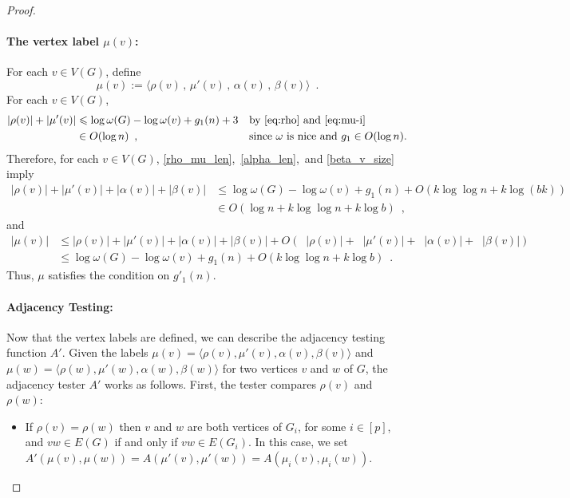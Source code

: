 \documentclass[twoside,leqno]{article}
\let\eqref\cref
\renewcommand{\le}{\leqslant}
\renewcommand{\leq}{\leqslant}
\newcommand{\david}[1]{\noindent{\color{orange} DW: #1}}
\newcommand{\vida}[1]{\noindent{\color{pink} VD: #1}}
\DeclareMathOperator{\lgg}{\hat{lg}}
\newcommand{\Oh}{O}
\begin{document}
\begin{proof}
  \paragraph{The vertex label $\mu(v)$:}
  For each $v\in V(G)$, define
  \[
    \mu(v):=
    \langle \rho(v)\,,\, \mu'(v)\,,\, \alpha(v)\,,\, \beta(v) \rangle \enspace .
  \]
  For each $v\in V(G)$,
  \begin{align}
    |\rho(v)|+|\mu'(v)|
     & \le \log\omega(G)-\log\omega(v)+g_1(n)+3 &  & \textrm{by~\eqref{eq:rho} and~\eqref{eq:mu-i}} \label{rho_mu_len} \\
     & \in \Oh(\log n) \enspace ,               &  & \textrm{since $\omega$ is nice and $g_1\in\Oh(\log n)$.}
    \label{rho_mu_len_x}
  \end{align}
  Therefore, for each $v\in V(G)$, \eqref{rho_mu_len},~\eqref{alpha_len},~and \eqref{beta_v_size} imply
  \begin{align*}
    |\rho(v)|+|\mu'(v)| + |\alpha(v)| + |\beta(v)|
     & \leq
    \log\omega(G)-\log\omega(v) + g_1(n) + \Oh(k\log\log n+k\log(bk)) \\
     & \in\Oh(\log n + k\log\log n+k\log b)\enspace,
  \end{align*}
  and
  \begin{align*}
    |\mu(v)|
     & \leq |\rho(v)|+|\mu'(v)| + |\alpha(v)| + |\beta(v)| + \Oh(\lgg|\rho(v)|+\lgg|\mu'(v)| + \lgg|\alpha(v)| + \lgg|\beta(v)|) \\
     & \leq \log\omega(G)-\log\omega(v) + g_1(n) + \Oh(k\log\log n+k\log b) \enspace .
  \end{align*}
  Thus, $\mu$ satisfies the condition on $g'_1(n)$.

  \paragraph{Adjacency Testing:}
  Now that the vertex labels are defined, we can describe the adjacency testing function $A'$.
  Given the labels $\mu(v)=\langle\rho(v),\mu'(v),\alpha(v),\beta(v)\rangle$ and $\mu(w)=\langle\rho(w),\mu'(w),\alpha(w),\beta(w)\rangle$ for two vertices $v$ and $w$ of $G$, the adjacency tester $A'$ works as follows. First, the tester compares $\rho(v)$ and $\rho(w)$:
  \begin{itemize}
    \item If $\rho(v)=\rho(w)$ then $v$ and $w$ are both vertices of $G_i$, for some $i\in[p]$, and $vw\in E(G)$ if and only if $vw\in E(G_i)$.  In this case, we set $A'(\mu(v),\mu(w))=A(\mu'(v),\mu'(w))=A(\mu_i(v),\mu_i(w))$.


\end{itemize}
\end{proof}
\end{document}
